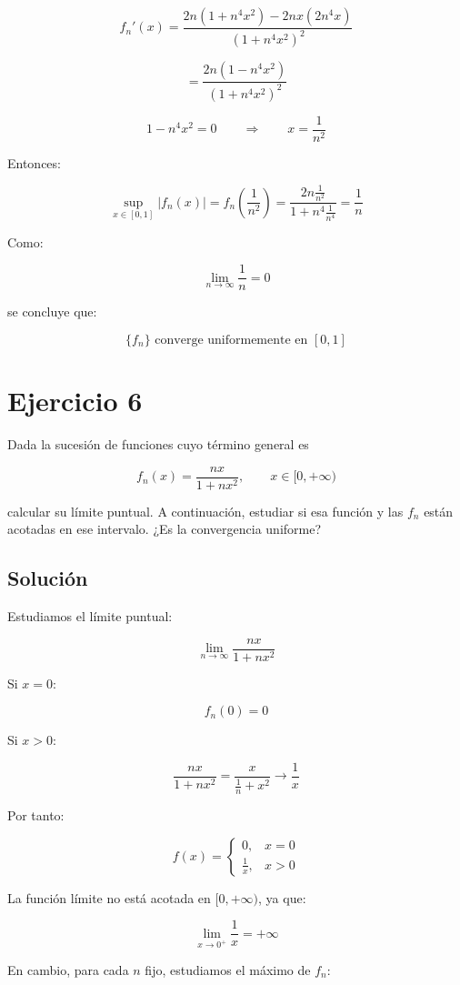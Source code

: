 \documentclass[fleqn]{article}
\begin{document}
	\[
	f_n'(x)
	=
	\frac{
	2n(1+n^4x^2)-2nx(2n^4x)
	}{
	(1+n^4x^2)^2
	}
	\]

	\[
	=
	\frac{
	2n(1-n^4x^2)
	}{
	(1+n^4x^2)^2
	}
	\]

	\[
	1-n^4x^2=0
	\qquad\Longrightarrow\qquad
	x=\frac{1}{n^2}
	\]

	Entonces:

	\[
	\sup_{x\in[0,1]}
	|f_n(x)|
	=
	f_n\left(\frac{1}{n^2}\right)
	=
	\frac{2n\frac{1}{n^2}}{1+n^4\frac{1}{n^4}}
	=
	\frac{1}{n}
	\]

	Como:

	\[
	\lim_{n\to\infty}\frac{1}{n}=0
	\]

	se concluye que:

	\[
	\boxed{
	\{f_n\}\text{ converge uniformemente en }[0,1]
	}
	\]

\section{Ejercicio 6}
	Dada la sucesión de funciones cuyo término general es

	\[
	f_n(x)=\frac{nx}{1+nx^2},
	\qquad x\in[0,+\infty)
	\]

	calcular su límite puntual. A continuación, estudiar si esa función y las $f_n$ están acotadas en ese intervalo. ¿Es la convergencia uniforme?

	\subsection{Solución}

	Estudiamos el límite puntual:

	\[
	\lim_{n\to\infty}
	\frac{nx}{1+nx^2}
	\]

	Si $x=0$:

	\[
	f_n(0)=0
	\]

	Si $x>0$:

	\[
	\frac{nx}{1+nx^2}
	=
	\frac{x}{\frac{1}{n}+x^2}
	\longrightarrow
	\frac{1}{x}
	\]

	Por tanto:

	\[
	f(x)=
	\begin{cases}
	0, & x=0 \\[1mm]
	\displaystyle\frac{1}{x}, & x>0
	\end{cases}
	\]

	La función límite no está acotada en $[0,+\infty)$, ya que:

	\[
	\lim_{x\to0^+}\frac{1}{x}=+\infty
	\]

	En cambio, para cada $n$ fijo, estudiamos el máximo de $f_n$:
\end{document}
